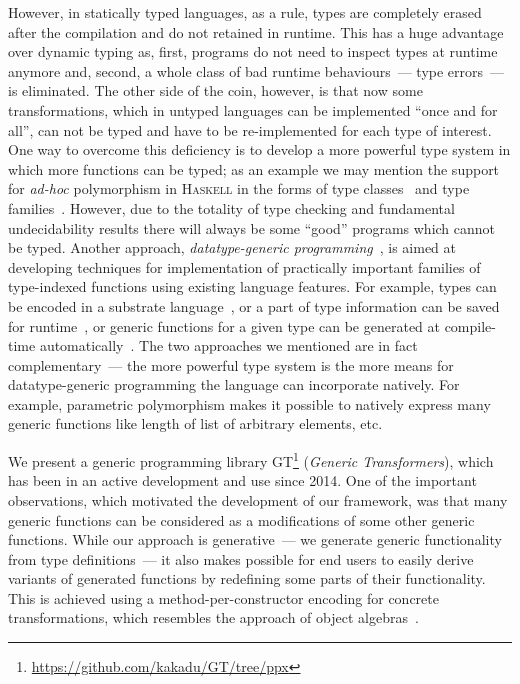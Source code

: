 However, in statically typed languages, as a rule, types are completely erased after the compilation and do not retained in runtime. This has a huge advantage over
dynamic typing as, first, programs do not need to inspect types at runtime anymore and, second, a whole class of bad runtime behaviours~--- type errors~---
is eliminated. The other side of the coin, however, is that now some transformations, which in untyped languages can be implemented ``once and for all'',
can not be typed and have to be re-implemented for each type of interest. One way to overcome this deficiency is to develop a more powerful type system in
which more functions can be typed; as an example we may mention the support for \emph{ad-hoc} polymorphism in \textsc{Haskell} in the forms of type
classes~\cite{TypeClasses} and type families~\cite{TypeFamilies}. However, due to the totality of type checking and fundamental undecidability results there
will always be some ``good'' programs which cannot be typed. Another approach, \emph{datatype-generic programming}~\cite{DGP}, is aimed at developing techniques for
implementation of practically important families of type-indexed functions using existing language features. For example, types can be encoded in a substrate
language~\cite{Hinze,InstantGenerics,GenericOCaml}, or a part of type information can be saved for runtime~\cite{SYB,SYBOCaml}, or generic functions for a given
type can be generated at compile-time automatically~\cite{Yallop,PPXLib}. The two approaches we mentioned are in fact complementary~--- the more powerful
type system is the more means for datatype-generic programming the language can incorporate natively. For example, parametric polymorphism makes it possible
to natively express many generic functions like length of list of arbitrary elements, etc.

We present a generic programming library \textsc{GT}\footnote{\url{https://github.com/kakadu/GT/tree/ppx}} (\emph{Generic Transformers}), which has been in an
active development and use since 2014. One of the important observations, which motivated the development of our framework, was that many generic functions
can be considered as a modifications of some other generic functions. While our approach is generative~--- we generate generic functionality from type definitions~---
it also makes possible for end users to easily derive variants of generated functions by redefining some parts of their functionality. This is achieved using
a method-per-constructor encoding for concrete transformations, which resembles the approach of object algebras~\cite{ObjectAlgebras}.

